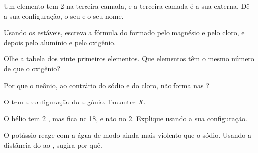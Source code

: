 \begin{exercise}[$\star\star$]\label{exo:g10:electron-shells:7}
Um elemento tem 2  na terceira camada, e a terceira camada é a
sua  externa. Dê a sua configuração, o seu  e o seu
nome.
\end{exercise}

\begin{exercise}[$\star\star$]\label{exo:g10:electron-shells:8}
Usando os  estáveis, escreva a fórmula do  formado
pelo magnésio e pelo cloro, e depois pelo alumínio e pelo oxigênio.
\end{exercise}

\begin{exercise}[$\star\star$]\label{exo:g10:electron-shells:9}
Olhe a tabela dos vinte primeiros elementos. Que elementos têm o mesmo
número de  que o oxigênio?
\end{exercise}

\begin{exercise}[$\star\star$]\label{exo:g10:electron-shells:10}
Por que o neônio, ao contrário do sódio e do cloro, não forma  nas
?
\end{exercise}

\begin{exercise}[$\star\star$]\label{exo:g10:electron-shells:11}
O   tem a configuração do argônio. Encontre $X$.
\end{exercise}

\begin{exercise}[$\star\star\star$]\label{exo:g10:electron-shells:12}
O hélio tem 2 , mas fica no  18, e não no
 2. Explique usando a sua configuração.
\end{exercise}

\begin{exercise}[$\star\star\star$]\label{exo:g10:electron-shells:13}
O potássio reage com a água de modo ainda mais violento que o sódio.
Usando a distância do  ao , sugira por quê.
\end{exercise}

